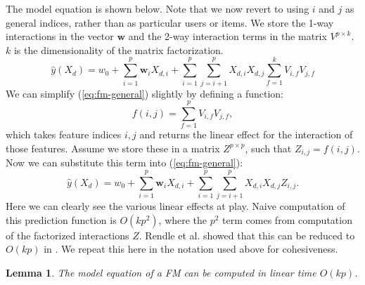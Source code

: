\documentclass[10pt]{journal}
\newtheorem{lemma}{Lemma}
\begin{document}
The model equation is shown below. Note that we now revert to using $i$ and $j$
as general indices, rather than as particular users or items. We store the 1-way
interactions in the vector $\bm{w}$ and the 2-way interaction terms in the
matrix $V^{p \times k}$. $k$ is the dimensionality of the matrix factorization.
%
\begin{equation} \label{eq:fm-general}
    \hat{y}(X_d) = w_0 + \sum_{i=1}^p \bm{w}_i X_{d,i} +
        \sum_{i=1}^p \sum_{j=i+1}^p X_{d,i} X_{d,j} \sum_{f=1}^k V_{i,f} V_{j,f}
\end{equation}
%
We can simplify (\ref{eq:fm-general}) slightly by defining a function:
%
\begin{equation} \label{eq:factorize-function}
    f(i, j) = \sum_{f=1}^p V_{i,f} V_{j,f},
\end{equation}
%
which takes feature indices $i, j$ and returns the linear effect for the
interaction of those features. Assume we store these in a matrix $Z^{p \times
p}$, such that $Z_{i,j} = f(i, j)$. Now we can substitute this term into
(\ref{eq:fm-general}):
%
\begin{equation} \label{eq:fm-sub-factorized}
    \hat{y}(X_d) = w_0 + \sum_{i=1}^p \bm{w}_i X_{d,i} +
        \sum_{i=1}^p \sum_{j=i+1}^p X_{d,i} X_{d,j} Z_{i, j}.
\end{equation}
%
Here we can clearly see the various linear effects at play. Naive computation of
this prediction function is $O(kp^2)$, where the $p^2$ term comes from
computation of the factorized interactions $Z$. Rendle et al. showed that
this can be reduced to $O(kp)$ in \cite{rendle_factorization_2010}. We repeat
this here in the notation used above for cohesiveness.

\begin{lemma}
    The model equation of a FM can be computed in linear time $O(kp)$.
\end{lemma}
\end{document}
